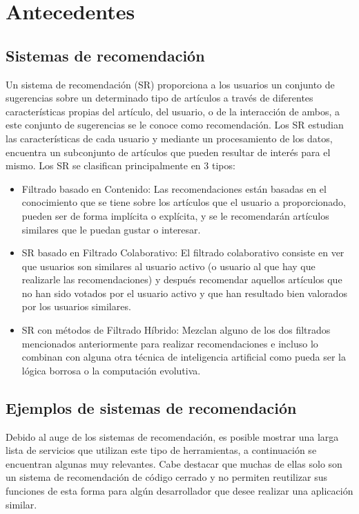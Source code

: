\chapter {Antecedentes}
\section {Sistemas de recomendación}
  Un sistema de recomendación (SR) proporciona a los usuarios un conjunto de sugerencias sobre un determinado tipo de artículos a través de diferentes características propias del artículo, del usuario, o de la interacción de ambos, a este conjunto de sugerencias se le conoce como recomendación. Los SR estudian las características de cada usuario y mediante un procesamiento de los datos, encuentra un subconjunto de artículos que pueden resultar de interés para el mismo. Los SR se clasifican principalmente en 3 tipos: 
  \begin{itemize}
    \item Filtrado basado en Contenido: Las recomendaciones están basadas en el conocimiento que se tiene sobre los artículos que el usuario a proporcionado, pueden ser de forma implícita o explícita, y se le recomendarán artículos similares que le puedan gustar o interesar. 
    \item SR basado en Filtrado Colaborativo: El filtrado colaborativo consiste en ver que usuarios son similares al usuario activo (o usuario al que hay que realizarle las recomendaciones) y después recomendar aquellos artículos que no han sido votados por el usuario activo y que han resultado bien valorados por los usuarios similares. 
    \item SR con métodos de Filtrado Híbrido: Mezclan alguno de los dos filtrados mencionados anteriormente para realizar recomendaciones e incluso lo combinan con alguna otra técnica de inteligencia artificial como pueda ser la lógica borrosa o la computación evolutiva. \cite{10}
  \end{itemize}

\section {Ejemplos de sistemas de recomendación}
  Debido al auge de los sistemas de recomendación, es posible mostrar una larga lista de servicios que utilizan este tipo de herramientas, a continuación se encuentran algunas muy relevantes. Cabe destacar que muchas de ellas solo son un sistema de recomendación de código cerrado y no permiten reutilizar sus funciones de esta forma para algún desarrollador que desee realizar una aplicación similar.

